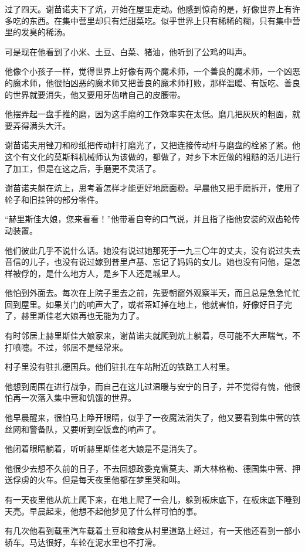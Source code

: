 过了四天。谢苗诺夫下了炕，开始在屋里走动。他感到惊奇的是，好像世界上有许多吃的东西。在集中营里却只有烂甜菜吃。似乎世界上只有稀稀的糊，只有集中营里的发臭的稀汤。

可是现在他看到了小米、土豆、白菜、猪油，他听到了公鸡的叫声。

他像个小孩子一样，觉得世界上好像有两个魔术师，一个善良的魔术师，一个凶恶的魔术师，他很怕凶恶的魔术师又把善良的魔术师打败，那样温暖、有饭吃、善良的世界就要消失，他又要用牙齿啃自己的皮腰带。

他摆弄起一盘手推的磨，因为这手磨的工作效率实在太低。磨几把灰灰的粗面，就要弄得满头大汗。

谢苗诺夫用锉刀和砂纸把传动杆打磨光了，又把连接传动杆与磨盘的栓紧了紧。他这个有文化的莫斯科机械师认为该做的，都做了，对乡下木匠做的粗糙的活儿进行了加工，但是在这之后，手磨更不灵活了。

谢苗诺夫躺在炕上，思考着怎样才能更好地磨面粉。早晨他又把手磨拆开，使用了轮子和旧挂钟的部分零件。

“赫里斯佳大娘，您来看看！”他带着自夸的口气说，并且指了指他安装的双齿轮传动装置。

他们彼此几乎不说什么话。她没有说过她那死于一九三〇年的丈夫，没有说过失去音信的儿子，也没有说过嫁到普里卢基、忘记了妈妈的女儿。她也没有问他，是怎样被俘的，是什么地方人，是乡下人还是城里人。

他怕到外面去。每次在上院子里去之前，先要朝窗外观察半天，而且总是急急忙忙回到屋里。如果关门的响声大了，或者茶缸掉在地上，他就害怕，好像好日子完了，赫里斯佳老大娘再也无能为力了。

有时邻居上赫里斯佳大娘家来，谢苗诺夫就爬到炕上躺着，尽可能不大声喘气，不打喷嚏。不过，邻居不是经常来。

村子里没有驻扎德国兵。他们驻扎在车站附近的铁路工人村里。

他想到周围在进行战争，而自己在这儿过温暖与安宁的日子，并不觉得有愧，他很怕再一次落入集中营和饥饿的世界。

他早晨醒来，很怕马上睁开眼睛，似乎了一夜魔法消失了，他又要看到集中营的铁丝网和警备队，又要听到空饭盒的响声了。

他闭着眼睛躺着，听听赫里斯佳老大娘是不是消失了。

他很少去想不久前的日子，不去回想政委克雷莫夫、斯大林格勒、德国集中营、押送俘虏的火车。但是每天夜里他都在梦里哭和叫。

有一天夜里他从炕上爬下来，在地上爬了一会儿，躲到板床底下，在板床底下睡到天亮。早晨起来，他想不起他梦见了什么样可怕的事。

有几次他看到载重汽车载着土豆和粮食从村里道路上经过，有一天他还看到一部小轿车。马达很好，车轮在泥水里也不打滑。


